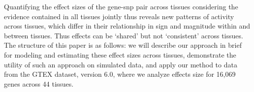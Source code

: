 Quantifying the effect sizes of the gene-snp pair across tissues considering the evidence contained in all tissues jointly thus reveals new patterns of activity across tissues, which differ in their relationship in sign and magnitude within and between tissues. Thus effects can be `shared' but not `consistent' across tissues. The structure of this paper is as follows: we will describe our approach in brief for modeling and estimating these effect sizes across tissues, demonstrate the utility of such an approach on simulated data, and apply our method to data from the GTEX dataset, version 6.0, where we analyze effects size for 16,069 genes across 44 tissues.
